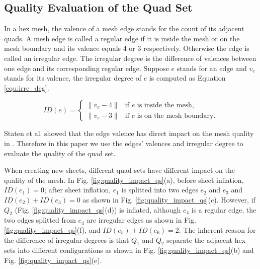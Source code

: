 \documentclass[final,5p,times,twocolumn]{elsarticle}
\begin{document}
\subsection{Quality Evaluation of the Quad Set}
\label{sec:quality_eval_qs}
In a hex mesh, the valence of a mesh edge stands for the count of its adjacent quads. A mesh edge is called a regular edge if it is inside the mesh or on the mesh boundary and its valence equals 4 or 3 respectively. Otherwise the edge is called an irregular edge. The irregular degree is the difference of valences between one edge and its corresponding regular edge. Suppose $e$ stands for an edge and $v_e$ stands for its valence, the irregular degree of $e$ is computed as Equation \ref{equ:irre_deg}.

\begin{equation}
\label{equ:irre_deg}
ID(e) =
 \begin{cases}
    \left \| v_e-4 \right \| & \text{if $e$ is inside the mesh,} \\
    \left \| v_e-3 \right \| & \text{if $e$ is on the mesh boundary.}
 \end{cases}
\end{equation}

Staten et al. showed that the edge valence has direct impact on the mesh quality in \cite{Staten2010d}. Therefore in this paper we use the edges' valences and irregular degree to evaluate the quality of the quad set.

When creating new sheets, different quad sets have different impact on the quality of the mesh. In Fig. \ref{fig:quality_impact_qs}(a), before sheet inflation, $ID(e_1)=0$; after sheet inflation, $e_1$ is splitted into two edges $e_2$ and $e_3$ and $ID(e_2)+ID(e_3)=0$ as shown in Fig. \ref{fig:quality_impact_qs}(c). However, if $Q_2$ (Fig. \ref{fig:quality_impact_qs}(d)) is inflated, although $e_4$ is a regular edge, the two edges splitted from $e_4$ are irregular edges as shown in Fig. \ref{fig:quality_impact_qs}(f), and $ID(e_5)+ID(e_6)=2$. The inherent reason for the difference of irregular degrees is that $Q_1$ and $Q_2$ separate the adjacent hex sets into different configurations as shown in Fig. \ref{fig:quality_impact_qs}(b) and Fig. \ref{fig:quality_impact_qs}(e).
\end{document}
